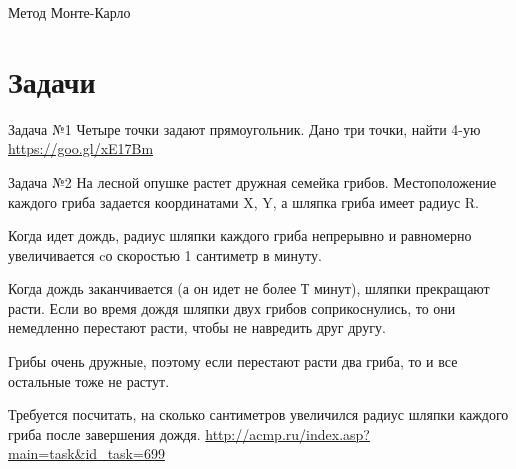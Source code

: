\documentclass{beamer}
\begin{document}
\begin{frame}{Метод Монте-Карло}
\end{frame}

\section{Задачи}
\setlength{\parindent}{4em}
\begin{frame}{Задача №1}
    Четыре точки задают прямоугольник. Дано три точки, найти 4-ую\\
    \url{https://goo.gl/xE17Bm}
\end{frame}

\begin{frame}{Задача №2}
На лесной опушке растет дружная семейка грибов. Местоположение каждого гриба задается координатами X, Y, а шляпка гриба имеет радиус R.\par
Когда идет дождь, радиус шляпки каждого гриба непрерывно и равномерно увеличивается cо скоростью 1 сантиметр в минуту. \par
Когда дождь заканчивается (а он идет не более Т минут), шляпки прекращают расти. Если во время дождя шляпки двух грибов соприкоснулись, то они немедленно перестают расти, чтобы не навредить друг другу. \par
Грибы очень дружные, поэтому если перестают расти два гриба, то и все остальные тоже не растут.\par
Требуется посчитать, на сколько сантиметров увеличился радиус шляпки каждого гриба после завершения дождя.
\url{http://acmp.ru/index.asp?main=task&id_task=699}
\end{frame}
\end{document}

